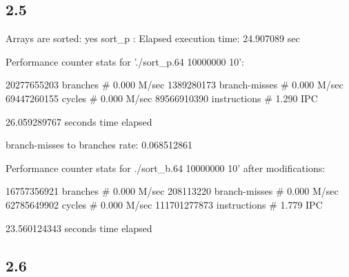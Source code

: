 \documentclass[12pt]{article}
\begin{document}
\subsection{2.5}

Arrays are sorted: yes
sort_p : Elapsed execution time: 24.907089 sec

 Performance counter stats for './sort_p.64 10000000 10':

    20277655203  branches                 #      0.000 M/sec
     1389280173  branch-misses            #      0.000 M/sec
    69447260155  cycles                   #      0.000 M/sec
    89566910390  instructions             #      1.290 IPC  

   26.059289767  seconds time elapsed

   branch-misses to branches rate: 0.068512861

 Performance counter stats for ./sort_b.64 10000000 10' after modifications:

    16757356921  branches                 #      0.000 M/sec
      208113220  branch-misses            #      0.000 M/sec
    62785649902  cycles                   #      0.000 M/sec
   111701277873  instructions             #      1.779 IPC

   23.560124343  seconds time elapsed


\subsection{2.6}
\end{document}
